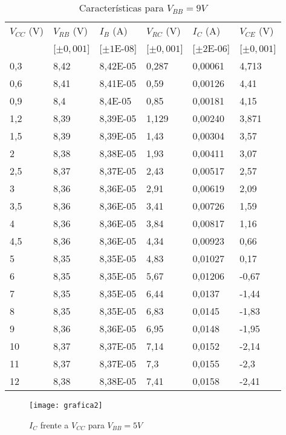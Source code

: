 \documentclass[a4paper,12pt,spanish]{article}
\begin{document}
\begin{table}[H]
	\centering
	\begin{tabular}{|l|l|l|l|l|l|}
		\hline
		$V_{CC}$ (V) & $V_{RB}$ (V)   & $I_B$ (A)     & $V_{RC}$ (V)  & $I_C$ (A)    & $V_{CE}$ (V)  \\ 
&[$\pm0,001$] &[$\pm1$E-08] &[$\pm0,001$] &[$\pm2$E-06]  &[$\pm0,001$]\\\hline
		0,3   & 8,42  & 8,42E-05 & 0,287 & 0,00061 & 4,713 \\ \hline
		0,6   & 8,41  & 8,41E-05 & 0,59  & 0,00126 & 4,41  \\ \hline
		0,9   & 8,4   & 8,4E-05  & 0,85  & 0,00181 & 4,15  \\ \hline
		1,2   & 8,39  & 8,39E-05 & 1,129 & 0,00240 & 3,871 \\ \hline
		1,5   & 8,39  & 8,39E-05 & 1,43  & 0,00304 & 3,57  \\ \hline
		2     & 8,38  & 8,38E-05 & 1,93  & 0,00411 & 3,07  \\ \hline
		2,5   & 8,37  & 8,37E-05 & 2,43  & 0,00517 & 2,57  \\ \hline
		3     & 8,36  & 8,36E-05 & 2,91  & 0,00619 & 2,09  \\ \hline
		3,5   & 8,36  & 8,36E-05 & 3,41  & 0,00726 & 1,59  \\ \hline
		4     & 8,36  & 8,36E-05 & 3,84  & 0,00817 & 1,16  \\ \hline
		4,5   & 8,36  & 8,36E-05 & 4,34  & 0,00923 & 0,66  \\ \hline
		5     & 8,35  & 8,35E-05 & 4,83  & 0,01027 & 0,17  \\ \hline
		6     & 8,35  & 8,35E-05 & 5,67  & 0,01206 & -0,67 \\ \hline
		7     & 8,35  & 8,35E-05 & 6,44  & 0,0137  & -1,44 \\ \hline
		8     & 8,35  & 8,35E-05 & 6,83  & 0,0145  & -1,83 \\ \hline
		9     & 8,36  & 8,36E-05 & 6,95  & 0,0148  & -1,95 \\ \hline
		10    & 8,37  & 8,37E-05 & 7,14  & 0,0152  & -2,14 \\ \hline
		11    & 8,37  & 8,37E-05 & 7,3   & 0,0155  & -2,3  \\ \hline
		12    & 8,38  & 8,38E-05 & 7,41  & 0,0158  & -2,41 \\ \hline
	\end{tabular}
	\caption{Características para $V_{BB} = 9 \si{V}$}
	\label{tab:my-table}
\end{table}

\begin{figure}[H]
	\centering
	\texttt{[image: grafica2]}
	\caption{$I_C$ frente a $V_{CC}$ para $V_{BB} = 5\si{V}$}
	\label{fig:grafica2}
\end{figure}
\end{document}
